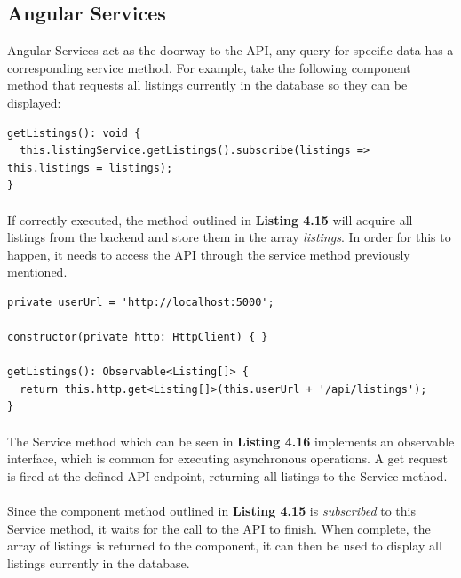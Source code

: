 \subsection{Angular Services}
Angular Services act as the doorway to the API, any query for specific data has a corresponding service method. For example, take the following component method that requests all listings currently in the database so they can be displayed:

\begin{lstlisting}[caption=Method for Acquiring all Listings]
getListings(): void {
  this.listingService.getListings().subscribe(listings => this.listings = listings);
}
\end{lstlisting}

\paragraph{}
If correctly executed, the method outlined in \textbf{Listing 4.15} will acquire all listings from the backend and store them in the array \textit{listings}. In order for this to happen, it needs to access the API through the service method previously mentioned. \newline

\begin{lstlisting}[caption=Service Method for Retrieving all Listings]
private userUrl = 'http://localhost:5000'; 

constructor(private http: HttpClient) { }

getListings(): Observable<Listing[]> {
  return this.http.get<Listing[]>(this.userUrl + '/api/listings');
}
\end{lstlisting}

\paragraph{}
The Service method which can be seen in \textbf{Listing 4.16} implements an observable interface, which is common for executing asynchronous operations. A get request is fired at the defined API endpoint, returning all listings to the Service method. 

\paragraph{}
Since the component method outlined in \textbf{Listing 4.15} is \textit{subscribed} to this Service method, it waits for the call to the API to finish. When complete, the array of listings is returned to the component, it can then be used to display all listings currently in the database.

